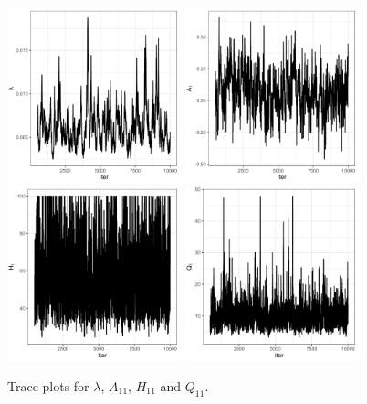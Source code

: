 \begin{figure}[h!]
    \centering
    \includegraphics[width=0.45\textwidth]{../figures/trace_lambda.png}
    \includegraphics[width=0.45\textwidth]{../figures/trace_A11.png}
    \includegraphics[width=0.45\textwidth]{../figures/trace_H11.png}
    \includegraphics[width=0.45\textwidth]{../figures/trace_Q11.png}
    \caption{Trace plots for $\lambda$, $A_{11}$, $H_{11}$ and $Q_{11}$.}
\end{figure}

